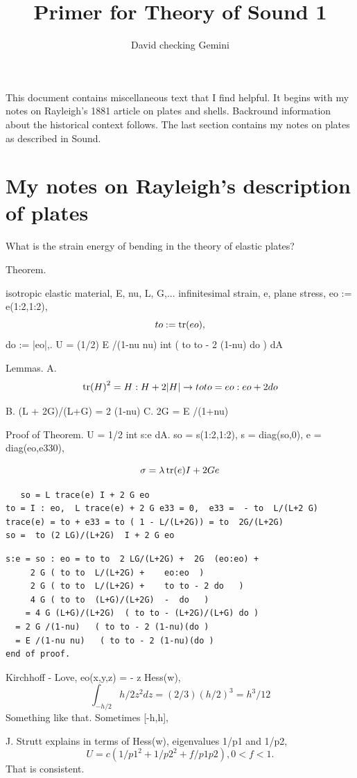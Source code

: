\documentclass[11pt, a4paper]{amsart}
\title{Primer for Theory of Sound 1}
\author{David checking Gemini}
\date{}
\begin{document}
This document contains miscellaneous text that I find helpful.  It begins with
my notes on Rayleigh's 1881 article on plates and shells.  Backround
information about the historical context follows.  The last section contains my
notes on plates as described in Sound.


\maketitle



%

\section{My notes on Rayleigh's description of plates}
What is the strain energy of bending in the theory of elastic plates?

Theorem.

isotropic elastic material, E, nu, L, G,...
infinitesimal strain, e, plane stress,
eo := e(1:2,1:2),
\[
to := \operatorname{tr}(eo),
\]
  do := |eo|,.
  U = (1/2)  E /(1-nu nu)  int  ( to to - 2 (1-nu) do ) dA

Lemmas.
A.
\[
{\operatorname{tr}(H)}^2 = H:H + 2 |H|  \rightarrow  to to = eo : eo + 2 do
\]

B.  (L + 2G)/(L+G) =  2 (1-nu)
C.  2G = E /(1+nu)

Proof of Theorem.  U = 1/2 int s:e dA.
so = s(1:2,1:2),  s = diag(so,0), e = diag(eo,e330),

\[
   \sigma = \lambda \operatorname{tr} (e) I + 2 G  e
\]
\begin{verbatim}
   so = L trace(e) I + 2 G eo
to = I : eo,  L trace(e) + 2 G e33 = 0,  e33 =  - to  L/(L+2 G)
trace(e) = to + e33 = to ( 1 - L/(L+2G)) = to  2G/(L+2G)
so =  to (2 LG)/(L+2G)  I + 2 G eo
\end{verbatim}

\begin{verbatim}
s:e = so : eo = to to  2 LG/(L+2G) +  2G  (eo:eo) +
     2 G ( to to  L/(L+2G) +    eo:eo  )
     2 G ( to to  L/(L+2G) +    to to - 2 do   )
     4 G ( to to  (L+G)/(L+2G)  -  do   )
    = 4 G (L+G)/(L+2G)  ( to to - (L+2G)/(L+G) do )
  = 2 G /(1-nu)   ( to to - 2 (1-nu)(do )
  = E /(1-nu nu)   ( to to - 2 (1-nu)(do )
end of proof.
\end{verbatim}


Kirchhoff - Love,  eo(x,y,z) = - z Hess(w),
\[
\int_{-h/2}{h/2} z^2 dz = (2/3) (h/2)^3 = h^3/12
\]
Something like that.  Sometimes  [-h,h],

J. Strutt explains in terms of
Hess(w),  eigenvalues  1/p1 and 1/p2,
\[
U = c ( 1/p1^2 + 1/p2^2 + f /p1 p2 ),  0 < f < 1.
\]
That is consistent.
\printbibliography[heading=bibintoc,title={References}]
\end{document}
